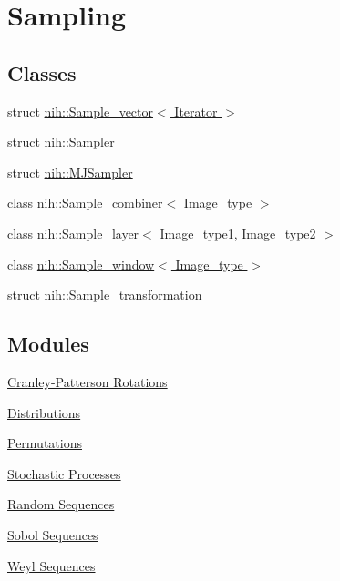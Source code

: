 \hypertarget{group__sampling}{
\section{\-Sampling}
\label{group__sampling}
}
\subsection*{\-Classes}
\begin{DoxyCompactItemize}
\item 
struct \hyperlink{structnih_1_1_sample__vector}{nih\-::\-Sample\-\_\-vector$<$ Iterator $>$}
\item 
struct \hyperlink{structnih_1_1_sampler}{nih\-::\-Sampler}
\item 
struct \hyperlink{structnih_1_1_m_j_sampler}{nih\-::\-M\-J\-Sampler}
\item 
class \hyperlink{classnih_1_1_sample__combiner}{nih\-::\-Sample\-\_\-combiner$<$ Image\-\_\-type $>$}
\item 
class \hyperlink{classnih_1_1_sample__layer}{nih\-::\-Sample\-\_\-layer$<$ Image\-\_\-type1, Image\-\_\-type2 $>$}
\item 
class \hyperlink{classnih_1_1_sample__window}{nih\-::\-Sample\-\_\-window$<$ Image\-\_\-type $>$}
\item 
struct \hyperlink{structnih_1_1_sample__transformation}{nih\-::\-Sample\-\_\-transformation}
\end{DoxyCompactItemize}
\subsection*{\-Modules}
\begin{DoxyCompactItemize}
\item 
\hyperlink{group__cp__rotations}{\-Cranley-\/\-Patterson Rotations}
\item 
\hyperlink{group__distributions}{\-Distributions}
\item 
\hyperlink{group__permutations}{\-Permutations}
\item 
\hyperlink{group__processes}{\-Stochastic Processes}
\item 
\hyperlink{group__random}{\-Random Sequences}
\item 
\hyperlink{group__sobol}{\-Sobol Sequences}
\item 
\hyperlink{group__weyl}{\-Weyl Sequences}
\end{DoxyCompactItemize}
